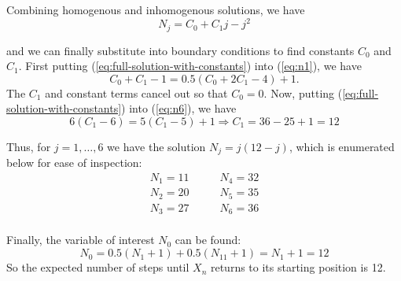\documentclass{homework}
\begin{document}
Combining homogenous and inhomogenous solutions, we have
\begin{equation}
    N_j = C_0 + C_1j - j^2
    \label{eq:full-solution-with-constants}
\end{equation}

and we can finally substitute into boundary conditions to find constants $C_0$
and $C_1$. First putting (\ref{eq:full-solution-with-constants})
into (\ref{eq:n1}), we have
\begin{equation*}
    C_0 + C_1 - 1 = 0.5 (C_0 + 2C_1 - 4) + 1.
\end{equation*}
The $C_1$ and constant terms cancel out so that $C_0 = 0$. Now, putting
(\ref{eq:full-solution-with-constants}) into (\ref{eq:n6}), we have
\begin{equation*}
    6(C_1 - 6) = 5(C_1 - 5) + 1 \Rightarrow C_1 = 36-25+1 = 12
\end{equation*}

Thus, for $j=1,\dots,6$ we have the solution $N_j = j(12 - j)$, which
is enumerated below for ease of inspection:
\begin{align*}
    N_1 = 11 &\qquad N_4 = 32 \\
    N_2 = 20 &\qquad N_5 = 35 \\
    N_3 = 27 &\qquad N_6 = 36 \\
\end{align*}

Finally, the variable of interest $N_0$ can be found:
\begin{equation*}
    N_0 = 0.5 (N_1 + 1) + 0.5 (N_{11} + 1) = N_1 + 1 = 12
\end{equation*}
So the expected number of steps until $X_n$ returns to its starting position
is 12.
\end{document}
